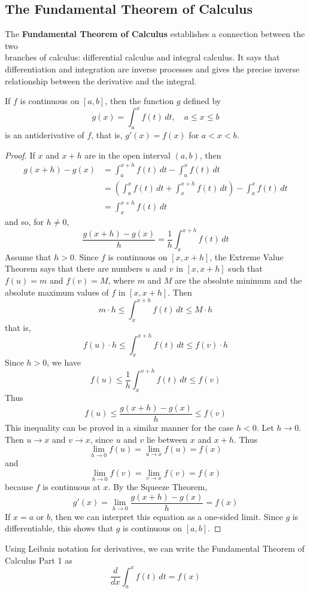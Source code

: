 \subsection{The Fundamental Theorem of Calculus}

The \textbf{Fundamental Theorem of Calculus} establishes a connection between the two \\
branches of calculus: differential calculus and integral calculus.
It says that differentiation and integration are inverse processes and gives
the precise inverse relationship between the derivative and the integral.
\begin{theorem}
    If \(f\) is continuous on \([a,b]\), then the function \(g\) defined by
    \[g(x)=\int_a^x f(t)\,dt,\quad a\leq x\leq b\]
    is an antiderivative of \(f\), that is, \(g'(x)=f(x)\) for \(a<x<b\).
\end{theorem}
\begin{proof}
    If \(x\) and \(x+h\) are in the open interval \((a,b)\), then
    \begin{align*}
        g(x+h)-g(x) &= \int_a^{x+h}f(t)\,dt-\int_a^x f(t)\,dt \\
        &= \left(\int_a^x f(t)\,dt+\int_x^{x+h}f(t)\,dt\right)
        -\int_a^x f(t)\,dt \\
        &= \int_x^{x+h}f(t)\,dt
    \end{align*}
    and so, for \(h\neq 0\),
    \[\frac{g(x+h)-g(x)}{h}=\frac{1}{h}\int_x^{x+h}f(t)\,dt\]
    Assume that \(h>0\).
    Since \(f\) is continuous on \([x,x+h]\), the Extreme Value Theorem says
    that there are numbers \(u\) and \(v\) in \([x,x+h]\) such that \(f(u)=m\)
    and \(f(v)=M\), where \(m\) and \(M\) are the absolute minimum and the
    absolute maximum values of \(f\) in \([x,x+h]\).
    Then
    \[m\cdot h\leq\int_x^{x+h}f(t)\,dt\leq M\cdot h\]
    that is,
    \[f(u)\cdot h\leq\int_x^{x+h}f(t)\,dt\leq f(v)\cdot h\]
    Since \(h>0\), we have
    \[f(u)\leq\frac{1}{h}\int_x^{x+h}f(t)\,dt\leq f(v)\]
    Thus
    \[f(u)\leq\frac{g(x+h)-g(x)}{h}\leq f(v)\]
    This inequality can be proved in a similar manner for the case \(h<0\).
    Let \(h\to 0\).
    Then \(u\to x\) and \(v\to x\), since \(u\) and \(v\) lie between \(x\)
    and \(x+h\).
    Thus
    \[\lim_{h\to 0}f(u)=\lim_{u\to x}f(u)=f(x)\]
    and
    \[\lim_{h\to 0}f(v)=\lim_{v\to x}f(v)=f(x)\]
    because \(f\) is continuous at \(x\).
    By the Squeeze Theorem,
    \[g'(x)=\lim_{h\to 0}\frac{g(x+h)-g(x)}{h}=f(x)\]
    If \(x=a\) or \(b\), then we can interpret this equation as a one-sided
    limit.
    Since \(g\) is differentiable, this shows that  \(g\) is continuous on
    \([a,b]\).
\end{proof}
Using Leibniz notation for derivatives, we can write the Fundamental Theorem
of Calculus Part 1 as
\[\frac{d}{dx}\int_a^x f(t)\,dt=f(x)\]

